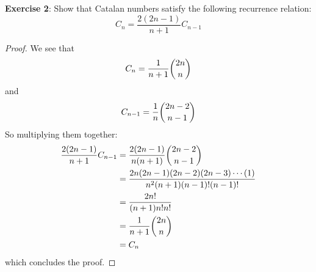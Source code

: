 \documentclass{article}
\begin{document}
\textbf{Exercise 2}: Show that Catalan numbers satisfy the following recurrence relation:
    \begin{equation*}
        C_{n} = \dfrac{2(2n - 1)}{n + 1}C_{n - 1}
    \end{equation*}
        \begin{proof}
            We see that
                \begin{equation*}
                    C_{n} = \dfrac{1}{n + 1}\dbinom{2n}{n}
                \end{equation*}
            and
                \begin{equation*}
                    C_{n - 1} = \dfrac{1}{n}\dbinom{2n - 2}{n - 1}
                \end{equation*}
            So multiplying them together:
                \begin{align*}
                    \dfrac{2(2n - 1)}{ n + 1}C_{n - 1} &=  \dfrac{2(2n - 1)}{n(n + 1)}\dbinom{2n - 2}{n - 1}                          \\
                                                       &= \dfrac{2n(2n - 1)(2n - 2)(2n - 3) \cdots (1)}{n^{2}(n + 1)(n - 1)!(n - 1)!} \\
                                                       &= \dfrac{2n!}{(n + 1)n!n!}                                                    \\
                                                       &= \dfrac{1}{n + 1}\dbinom{2n}{n}                                              \\
                                                       &= C_{n}                                                                         
                \end{align*}
            which concludes the proof.
        \end{proof}
\end{document}
